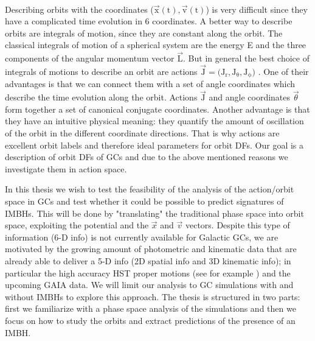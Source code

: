 \\\par Describing orbits with the coordinates (\(\vec{\mathrm{x}}(\mathrm{t}),\vec{\mathrm{v}}(\mathrm{t})\)) is very difficult since they have a complicated time evolution in 6 coordinates. A better way to describe orbits are integrals of motion, since they are constant along the orbit. The classical integrals of motion of a spherical system are the energy E and the three components of the angular momentum vector \(\vec{\mathrm{L}}\). But in general the best choice of integrals of motions to describe an orbit are actions \(\vec{\mathrm{J}}=(\mathrm{J_r,J_\theta,J_\phi)}\) \citep[p. 220/221]{2008gady.book.....B}. One of their advantages is that we can connect them with a set of angle coordinates which describe the time evolution along the orbit. Actions $\vec{\mathrm{J}}$ and angle coordinates $\vec{\theta}$ form together a set of canonical conjugate coordinates. Another advantage is that they have an intuitive physical meaning: they quantify the amount of oscillation of the orbit in the different coordinate directions. That is why actions are excellent orbit labels and therefore ideal parameters for orbit \acp{DF}. Our goal is a description of orbit \acp{DF} of \acp{GC} and due to the above mentioned reasons we investigate them in action space.
\\\par In this thesis we wish to test the feasibility of the analysis of the action/orbit space in \acp{GC} and test whether it could be possible to predict  signatures of \acp{IMBH}. This will be done by "translating" the traditional phase space into orbit space, exploiting the potential and the \(\vec{x}\) and \(\vec{v}\) vectors. Despite this type of information (6-D info) is not currently available for Galactic \acp{GC}, we are motivated by the growing amount of photometric and kinematic data that are already able to deliver a 5-D info (2D spatial info and 3D kinematic info); in particular the high accuracy \ac{HST} proper motions (see for example \citealp{2014ApJ...797..115B}) and the upcoming GAIA data. We will limit our analysis to \ac{GC} simulations with and without \acp{IMBH} to explore this approach. The thesis is structured in two parts: first we familiarize with a phase space analysis of the simulations and then we focus on how to study the orbits and extract predictions of the presence of an \ac{IMBH}.

